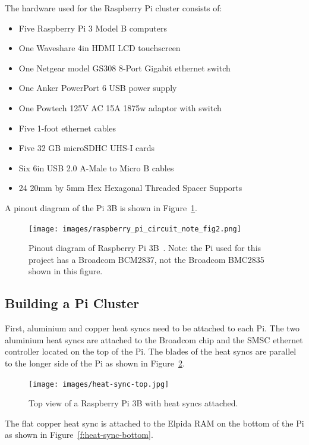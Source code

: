 The hardware used for the Raspberry Pi cluster consists of:

\begin{itemize}
\item Five Raspberry Pi 3 Model B computers 
\item One Waveshare 4in HDMI LCD touchscreen
\item One Netgear model GS308 8-Port Gigabit ethernet switch
\item One Anker PowerPort 6 USB power supply
\item One Powtech 125V AC 15A 1875w adaptor with switch
\item Five 1-foot ethernet cables
\item Five 32 GB microSDHC UHS-I cards
\item Six 6in USB 2.0 A-Male to Micro B cables
\item 24 20mm by 5mm Hex Hexagonal Threaded Spacer Supports
\end{itemize}

A pinout diagram of the Pi 3B is shown in Figure~\ref{f:pinout-diagram}.

\begin{figure}[!ht]
  \centering\texttt{[image: images/raspberry\_pi\_circuit\_note\_fig2.png]} \caption{Pinout
  diagram of Raspberry Pi 3B~\cite{hid-sp18-419-pi-pinout}. Note: the
  Pi used for this project has a Broadcom BCM2837, not the Broadcom
  BMC2835 shown in this figure.}\label{f:pinout-diagram}
\end{figure}

\subsection{Building a Pi Cluster}
First, aluminium and copper heat syncs need to be attached to each
Pi. The two aluminium heat syncs are attached to the Broadcom chip and
the SMSC ethernet controller located on the top of the Pi. The blades
of the heat syncs are parallel to the longer side of the Pi as shown
in Figure~\ref{f:heat-sync-top}.

\begin{figure}[!ht]
  \centering\texttt{[image: images/heat-sync-top.jpg]} \caption{Top
  view of a Raspberry Pi 3B with heat syncs
  attached.}\label{f:heat-sync-top}
\end{figure}

The flat copper heat sync is attached to the Elpida RAM on the bottom
of the Pi as shown in Figure~\ref{f:heat-sync-bottom}.

